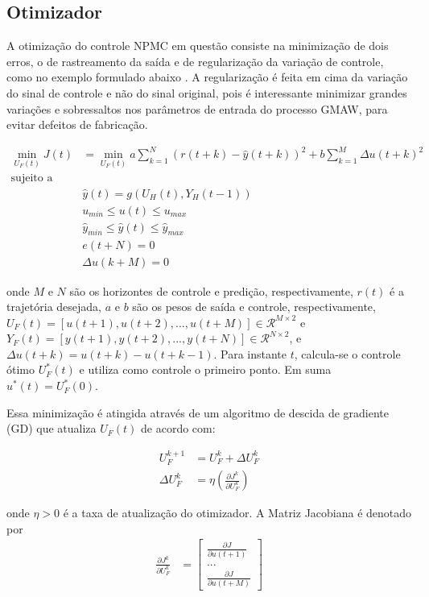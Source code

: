 \subsection{Otimizador}
A otimização do controle NPMC em questão consiste na minimização de dois erros, o de rastreamento da saída e de regularização da variação de controle, como no exemplo formulado abaixo \cite{yan2022lstm}. A regularização é feita em cima da variação do sinal de controle e não do sinal original, pois é interessante minimizar grandes variações e sobressaltos nos parâmetros de entrada do processo GMAW, para evitar defeitos de fabricação.

\begin{align}
    \min_{U_F(t)} J(t) &= \min_{U_F(t)} a \sum_{k=1}^{N}(r(t+k)-\hat{y}(t+k))^2 + b \sum_{k=1}^{M}\Delta u(t+k)^2 \\
    \text{sujeito a} & \\
    &\hat{y}(t) = g(U_H(t), Y_H(t-1)) \\
    &u_{min} \leq u(t) \leq u_{max} \\
    &\hat{y}_{min} \leq \hat{y}(t) \leq \hat{y}_{max} \\
    & e(t+N) = 0  \\
    & \Delta u(k+M) = 0
\end{align}

onde $M$ e $N$ são os horizontes de controle e predição, respectivamente, $r(t)$ é a trajetória desejada, $a$ e $b$ são os pesos de saída e controle, respectivamente, $U_F(t) = [u(t+1), u(t+2), ... , u(t+M)] \in \mathcal{R}^{M \times 2}$ e $Y_F(t) = [y(t+1), y(t+2), ... , y(t+N)] \in \mathcal{R}^{N \times 2}$, e $\Delta u(t+k) = u(t+k) - u(t+k-1)$. Para instante $t$, calcula-se o controle ótimo $U^*_F(t)$ e utiliza como controle o primeiro ponto. Em suma $u^*(t) = U^*_F(0)$. 

Essa minimização é atingida através de um algoritmo de descida de gradiente (GD) que atualiza $U_F(t)$ de acordo com:

\begin{align}
    U_F^{k+1} &= U_F^k + \Delta U_F^k \\
    \Delta U_F^k &= \eta\left(\frac{\partial J^k}{\partial U_F^k}\right)
\end{align}

onde $\eta > 0$ é a taxa de atualização do otimizador. A Matriz Jacobiana é denotado por
\begin{align} \label{eq:dJdU}
    \frac{\partial J^k}{\partial U_F^k} &= \begin{bmatrix}
        \frac{\partial J}{\partial u(t+1)} \\
        ... \\
        \frac{\partial J}{\partial u(t+M)} 
    \end{bmatrix}
\end{align}


